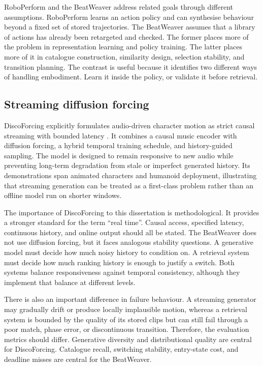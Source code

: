 RoboPerform and the BeatWeaver address related goals through different
assumptions. RoboPerform learns an action policy and can synthesise behaviour
beyond a fixed set of stored trajectories. The BeatWeaver assumes that a library
of actions has already been retargeted and checked. The former places more of
the problem in representation learning and policy training. The latter places
more of it in catalogue construction, similarity design, selection stability,
and transition planning. The contrast is useful because it identifies two
different ways of handling embodiment. Learn it inside the policy, or validate
it before retrieval.

\subsection{Streaming diffusion forcing}
\label{subsec:lit_discoforcing}

DiscoForcing explicitly formulates audio-driven character motion as strict
causal streaming with bounded latency \cite{ji2026discoforcing}. It combines a
causal music encoder with diffusion forcing, a hybrid temporal training
schedule, and history-guided sampling. The model is designed to remain
responsive to new audio while preventing long-term degradation from stale or
imperfect generated history. Its demonstrations span animated characters and
humanoid deployment, illustrating that streaming generation can be treated as
a first-class problem rather than an offline model run on shorter windows.

The importance of DiscoForcing to this dissertation is methodological. It
provides a stronger standard for the term ``real time''. Causal access,
specified latency, continuous history, and online output should all be stated.
The BeatWeaver does not use diffusion forcing, but it faces analogous
stability questions. A generative model must decide how much noisy history to
condition on. A retrieval system must decide how much ranking history is enough
to justify a switch. Both systems balance responsiveness against temporal
consistency, although they implement that balance at different levels.

There is also an important difference in failure behaviour. A streaming
generator may gradually drift or produce locally implausible motion, whereas a
retrieval system is bounded by the quality of its stored clips but can still
fail through a poor match, phase error, or discontinuous transition. Therefore,
the evaluation metrics should differ. Generative diversity and distributional
quality are central for DiscoForcing. Catalogue recall, switching stability,
entry-state cost, and deadline misses are central for the BeatWeaver.

